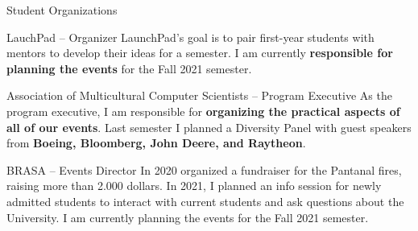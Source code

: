 \documentclass{article}
\newlength{\tabin}
\newlength{\secsep}
\newcommand{\lineunder}{\vspace*{-8pt} \\ \hspace*{-6pt} \hrulefill \\ \vspace*{-15pt}}
\newenvironment{tabbedsection}[1]{
  \begin{list}{}{
      \setlength{\itemsep}{0pt}
      \setlength{\labelsep}{0pt}
      \setlength{\labelwidth}{0pt}
      \setlength{\leftmargin}{\tabin}
      \setlength{\rightmargin}{\tabin}
      \setlength{\listparindent}{0pt}
      \setlength{\parsep}{0pt}
      \setlength{\parskip}{0pt}
      \setlength{\partopsep}{0pt}
      \setlength{\topsep}{#1}
    }
  \item[]
}{\end{list}}
\newenvironment{resume_section}[1]{
  \filbreak
  \vspace{2\secsep}
  \textsc{\large#1}
  \lineunder
  \begin{tabbedsection}{\secsep}
}{\end{tabbedsection}}
\newenvironment{resume_subsection}[2][]{
  \textbf{#2} \hfill {\footnotesize #1} \hspace{2em}
  \begin{tabbedsection}{0.5\secsep}
}{\end{tabbedsection}}
\begin{document}
\begin{resume_section}{Student Organizations}

	\begin{resume_subsection}{LauchPad -- Organizer}
		LaunchPad’s goal is to pair first-year students with mentors to develop their ideas for a semester. I am currently \textbf{responsible for planning the events} for the Fall 2021 semester.
	\end{resume_subsection}
	
	\begin{resume_subsection}{Association of Multicultural Computer Scientists -- Program Executive}
		As the program executive, I am responsible for\textbf{ organizing the practical aspects of all of our events}. Last semester I planned a Diversity Panel with guest speakers from \textbf{Boeing, Bloomberg, John Deere, and Raytheon}.
	\end{resume_subsection} 
	
	\begin{resume_subsection}{BRASA -- Events Director}
		In 2020 organized a fundraiser for the Pantanal fires, raising more than 2.000 dollars. In 2021, I planned an info session for newly admitted students to interact with current students and ask questions about the University. I am currently planning the events for the Fall 2021 semester.	
	\end{resume_subsection}
	
\end{resume_section}
\end{document}

